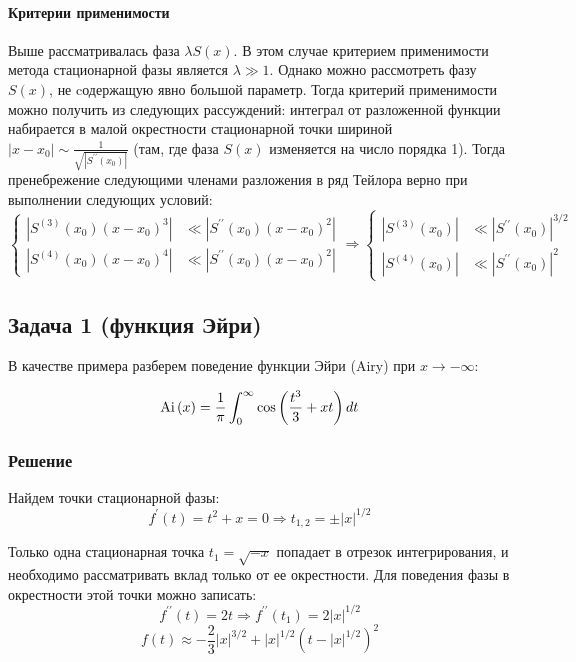 \documentclass[a4paper,12pt]{article}
\begin{document}
\paragraph{Критерии применимости}

Выше рассматривалась фаза $\lambda S(x)$. В этом случае критерием применимости метода стационарной фазы является $\lambda\gg 1$. Однако можно рассмотреть фазу $S(x)$, не cодержащую явно большой параметр. Тогда критерий применимости можно получить из следующих рассуждений: интеграл
от разложенной функции набирается в малой окрестности стационарной
точки шириной $|x-x_{0}|\sim\frac{1}{\sqrt{|S^{\prime\prime}(x_{0})|}}$
(там, где фаза $S(x)$ изменяется на число порядка 1). Тогда пренебрежение
следующими членами разложения в ряд Тейлора верно при выполнении следующих
условий: 
\[
\begin{cases}
|S^{(3)}(x_{0})(x-x_{0})^{3}| & \ll|S^{\prime\prime}(x_{0})(x-x_{0})^{2}|\\
|S^{(4)}(x_{0})(x-x_{0})^{4}| & \ll|S^{\prime\prime}(x_{0})(x-x_{0})^{2}|
\end{cases}\Rightarrow\begin{cases}
|S^{(3)}(x_{0})| & \ll|S^{\prime\prime}(x_{0})|^{3/2}\\
|S^{(4)}(x_{0})| & \ll|S^{\prime\prime}(x_{0})|^{2}
\end{cases}
\]



\subsection*{Задача 1 (функция Эйри)}

В качестве примера разберем поведение функции Эйри (Airy) при $x\to-\infty$:

\[
{\rm Ai}\left(x\right)=\frac{1}{\pi}\int_{0}^{\infty}\cos\left(\frac{t^{3}}{3}+xt\right)dt
\]



\subsubsection*{Решение}

Найдем точки стационарной фазы:
\[
f^{\prime}(t)=t^{2}+x=0\Rightarrow t_{1,2}=\pm|x|^{1/2}
\]

\noindent
Только одна стационарная точка $t_{1}=\sqrt{-x}$ попадает в отрезок
интегрирования, и необходимо рассматривать вклад только от ее окрестности.
Для поведения фазы в окрестности этой точки можно записать:
\[
f^{\prime\prime}(t)=2t\Rightarrow f^{\prime\prime}(t_{1})=2|x|^{1/2}
\]
\[
f(t)\approx-\frac{2}{3}|x|^{3/2}+|x|^{1/2}(t-|x|^{1/2})^{2}
\]
\end{document}
